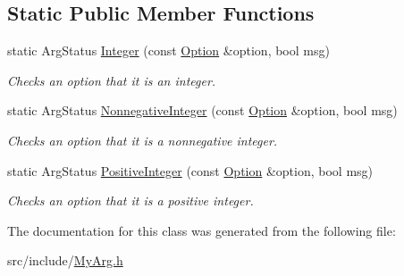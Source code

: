 \subsection*{Static Public Member Functions}
\begin{DoxyCompactItemize}
\item 
\hypertarget{classxmem_1_1config_1_1third__party_1_1_my_arg_aa96164ec393fdb12b359e33ee48e3c64}{static Arg\-Status \hyperlink{classxmem_1_1config_1_1third__party_1_1_my_arg_aa96164ec393fdb12b359e33ee48e3c64}{Integer} (const \hyperlink{classxmem_1_1config_1_1third__party_1_1_option}{Option} \&option, bool msg)}\label{classxmem_1_1config_1_1third__party_1_1_my_arg_aa96164ec393fdb12b359e33ee48e3c64}

\begin{DoxyCompactList}\small\item\em Checks an option that it is an integer. \end{DoxyCompactList}\item 
\hypertarget{classxmem_1_1config_1_1third__party_1_1_my_arg_a51af9350382f12100b5bd6b554c3bcf5}{static Arg\-Status \hyperlink{classxmem_1_1config_1_1third__party_1_1_my_arg_a51af9350382f12100b5bd6b554c3bcf5}{Nonnegative\-Integer} (const \hyperlink{classxmem_1_1config_1_1third__party_1_1_option}{Option} \&option, bool msg)}\label{classxmem_1_1config_1_1third__party_1_1_my_arg_a51af9350382f12100b5bd6b554c3bcf5}

\begin{DoxyCompactList}\small\item\em Checks an option that it is a nonnegative integer. \end{DoxyCompactList}\item 
\hypertarget{classxmem_1_1config_1_1third__party_1_1_my_arg_ad022660b254db34b578eb5b3fc9782a7}{static Arg\-Status \hyperlink{classxmem_1_1config_1_1third__party_1_1_my_arg_ad022660b254db34b578eb5b3fc9782a7}{Positive\-Integer} (const \hyperlink{classxmem_1_1config_1_1third__party_1_1_option}{Option} \&option, bool msg)}\label{classxmem_1_1config_1_1third__party_1_1_my_arg_ad022660b254db34b578eb5b3fc9782a7}

\begin{DoxyCompactList}\small\item\em Checks an option that it is a positive integer. \end{DoxyCompactList}\end{DoxyCompactItemize}


The documentation for this class was generated from the following file\-:\begin{DoxyCompactItemize}
\item 
src/include/\hyperlink{_my_arg_8h}{My\-Arg.\-h}\end{DoxyCompactItemize}
